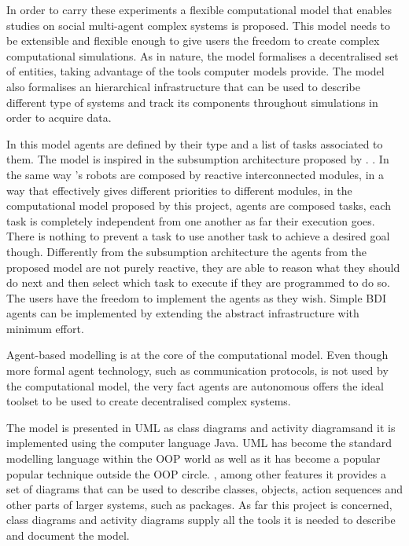 In order to carry these experiments a flexible computational model that enables studies on social multi-agent complex systems is proposed. This model needs to be extensible and flexible enough to give users the freedom to create complex computational simulations. As in nature, the model formalises a decentralised set of entities, taking advantage of the tools computer models provide. The model also formalises an hierarchical infrastructure that can be used to describe different type of systems and track its components throughout simulations in order to acquire data.
 
In this model agents are defined by their type and a list of tasks associated to them. The model is inspired in the subsumption architecture proposed by \citeauthor{1087032}. \cite{1087032} \cite{Brooks1986b}. In the same way \citeauthor{1087032}'s robots are composed by reactive interconnected modules, in a way that effectively gives different priorities to different modules, in the computational model proposed by this project, agents are composed tasks, each task is completely independent from one another as far their execution goes. There is nothing to prevent a task to use another task to achieve a desired goal though. Differently from the subsumption architecture the agents from the proposed model are not purely reactive, they are able to reason what they should do next and then select which task to execute if they are programmed to do so. The users have the freedom to implement the agents as they wish. Simple \ac{BDI} \cite{bratman1999intention} \cite{wooldridge2009introduction} agents can be implemented by extending the abstract infrastructure with minimum effort.

Agent-based modelling is at the core of the computational model. Even though more formal agent technology, such as communication protocols, is not used by the computational model, the very fact agents are autonomous offers the ideal toolset to be used to create decentralised complex systems.

The model is presented in \ac{UML} as class diagrams and activity diagramsand it is implemented using the computer language Java. \ac{UML} has become the standard modelling language within the \ac{OOP} world as well as it has become a popular popular technique outside the \ac{OOP} circle. \cite{fowler2004uml}, among other features it provides a set of diagrams that can be used to describe classes, objects, action sequences and other parts of larger systems, such as packages. As far this project is concerned, class diagrams and activity diagrams supply all the tools it is needed to describe and document the model.

